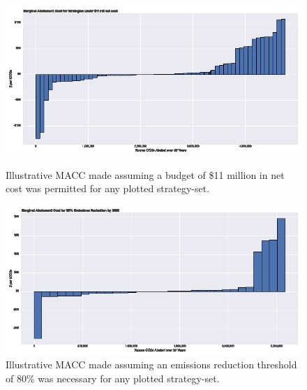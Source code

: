 \documentclass[twocolumn, a4paper,10pt]{article}
\begin{document}
\begin{figure}
\centering
\begin{minipage}[b]{.45\textwidth}
    \hspace*{-1.05cm}\includegraphics[scale=1.0]{figures/budget_macc.eps}
    \caption{Illustrative MACC made assuming a budget of \$11 million in net cost was permitted for any plotted strategy-set.}
    \label{fig:MACC_budget}
\end{minipage}\qquad
\begin{minipage}[b]{.45\textwidth}
    \hspace*{-.4cm}\includegraphics[scale=1.0]{figures/threshold_macc.eps}
    \caption{Illustrative MACC made assuming an emissions reduction threshold of 80\% was necessary for any plotted strategy-set.}
    \label{fig:MACC_threshold}
\end{minipage}
\end{figure}
\end{document}
